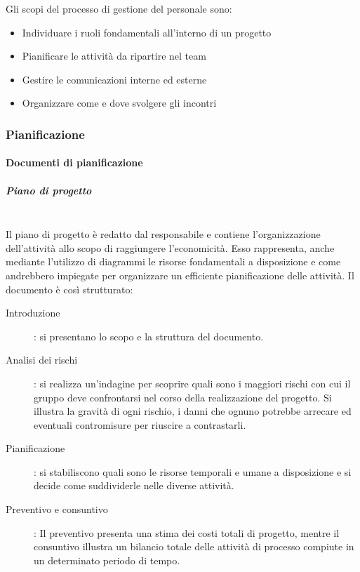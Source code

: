 \documentclass[../norme-di-progetto.tex]{subfiles}
\begin{document}
Gli scopi del processo di gestione del personale sono:

\begin{itemize}
  \item Individuare i ruoli fondamentali all'interno di un progetto
  \item Pianificare le attività da ripartire nel team
  \item Gestire le comunicazioni interne ed esterne
  \item Organizzare come e dove svolgere gli incontri
\end{itemize}

\subsubsection{Pianificazione}%
\label{subs:pianificazione}

\paragraph{Documenti di pianificazione}%
\label{par:documenti di pianificazione}

\subparagraph{Piano di progetto}%
\label{subp:piano di progetto}
\\Il piano di progetto è redatto dal responsabile e contiene l'organizzazione dell'attività allo scopo di raggiungere l'economicità. Esso rappresenta, anche mediante l'utilizzo di diagrammi le risorse fondamentali a disposizione e come andrebbero impiegate per organizzare un efficiente pianificazione delle attività. Il documento è così strutturato:
\begin{description}
  \item [Introduzione]: si presentano lo scopo e la struttura del documento.
  \item [Analisi dei rischi]: si realizza un'indagine per scoprire quali sono i maggiori rischi con cui il gruppo deve confrontarsi nel corso della realizzazione del progetto. Si illustra la gravità di ogni rischio, i danni che ognuno potrebbe arrecare ed eventuali contromisure per riuscire a contrastarli.
  \item [Pianificazione]: si stabiliscono quali sono le risorse temporali e umane a disposizione e si decide come suddividerle nelle diverse attività.
  \item [Preventivo e consuntivo]: Il preventivo presenta una stima dei costi totali di progetto, mentre il consuntivo illustra un bilancio totale delle attività di processo compiute in un determinato periodo di tempo.
\end{description}
\end{document}
